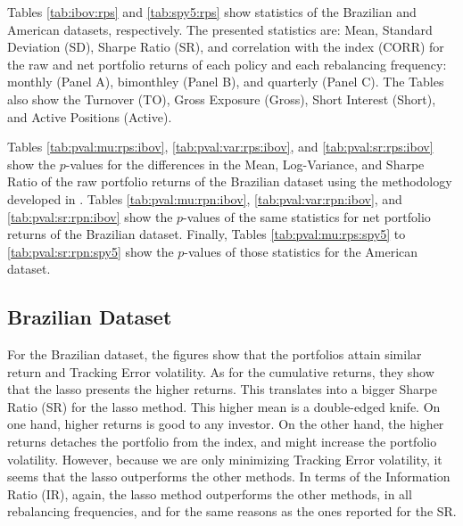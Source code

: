 \documentclass[12pt,oneside,a4paper]{memoir}
\begin{document}
Tables \ref{tab:ibov:rps} and \ref{tab:spy5:rps} show statistics of the Brazilian and American datasets, respectively.
The presented statistics are: Mean, Standard Deviation (SD), Sharpe Ratio (SR), and correlation with the index (CORR) for the raw and net portfolio returns of each policy and each rebalancing frequency: monthly (Panel A), bimonthley (Panel B), and quarterly (Panel C). 
The Tables also show the Turnover (TO), Gross Exposure (Gross), Short Interest (Short), and Active Positions (Active).


Tables 
\ref{tab:pval:mu:rps:ibov}, 
\ref{tab:pval:var:rps:ibov}, and 
\ref{tab:pval:sr:rps:ibov} 
show the $p$-values for the differences in the Mean, Log-Variance, and Sharpe Ratio of the raw portfolio returns of the Brazilian dataset using the methodology developed in .
Tables \ref{tab:pval:mu:rpn:ibov}, \ref{tab:pval:var:rpn:ibov}, and \ref{tab:pval:sr:rpn:ibov} show the $p$-values of the same statistics for net portfolio returns of the Brazilian dataset.
Finally, Tables \ref{tab:pval:mu:rps:spy5} to \ref{tab:pval:sr:rpn:spy5} 
show the $p$-values of those statistics for the American dataset.


\subsection*{Brazilian Dataset}

For the Brazilian dataset, the figures show that the portfolios attain similar return and Tracking Error volatility.
As for the cumulative returns, they show that the lasso presents the higher returns.
This translates into a bigger Sharpe Ratio (SR) for the lasso method.
This higher mean is a double-edged knife.
On one hand, higher returns is good to any investor.
On the other hand, the higher returns detaches the portfolio from the index, and might increase the portfolio volatility.
However, because we are only minimizing Tracking Error volatility, it seems that the lasso outperforms the other methods.
In terms of the Information Ratio (IR), again, the lasso method outperforms the other methods, in all rebalancing frequencies, and for the same reasons as the ones reported for the SR.
\end{document}
